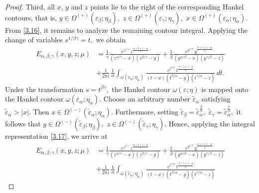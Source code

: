 \documentclass[10pt,a4paper]{amsart}
\begin{document}
\begin{proof}
Third, all $x$, $y$ and $z$ points lie to the right of the corresponding Hankel contours, that is,
$
y\in\Omega^{(+)}(\varepsilon_\beta;\eta_\beta),
\,\,
z\in\Omega^{(+)}(\varepsilon_\gamma;\eta_\gamma),\,\,x\in\Omega^{(+)}(\varepsilon_\alpha;\eta_\alpha)
$.
From \eqref{3.16}, it remains to analyze the remaining contour integral. Applying the change of variables
$
s^{1/\beta\gamma}=t,
$
we obtain
\begin{equation}\label{3.17}\begin{aligned}
E_{\alpha,\beta,\gamma}(x,y,z;\mu)
&=\frac{1}{\gamma}\frac{
e^{z^{1/\gamma}}
\,z^{\frac{\alpha+\beta+1-\mu}{\gamma}}}
{(z^{\alpha/\gamma}-x)(z^{\beta/\gamma}-y)}+\frac{1}{\beta}\frac{
e^{y^{1/\beta}}
\,y^{\frac{\alpha+\gamma+1-\mu}{\beta}}}
{(y^{\alpha/\beta}-x)(y^{\gamma/\beta}-z)}\\
&+
\frac{1}{2\pi i}\,
\frac{1}{\alpha}
\int_{\omega(\varepsilon_\alpha;\eta_\alpha)}
\frac{
e^{t^{1/\alpha}}
\,t^{\frac{\beta+\gamma+1-\mu}{\alpha}}
}
{
(t-x)(t^{\beta/\alpha}-y)(t^{\gamma/\alpha}-z)
}
\,dt.\end{aligned}\end{equation}
Under the transformation
$
s=t^{\beta\gamma},
$
the Hankel contour
$
\omega(\varepsilon;\eta)
$
is mapped onto the Hankel contour
$
\omega(\varepsilon_\alpha;\eta_\alpha).
$ Choose an arbitrary number $\widetilde{\varepsilon}_{\alpha}$ satisfying
$\widetilde{\varepsilon}_{\alpha}>|x|$. Then
$
x\in\Omega^{(-)}(\widetilde{\varepsilon}_{\alpha};\eta_\alpha).
$
Furthermore, setting
$
\widetilde{\varepsilon}_{\beta}
=\widetilde{\varepsilon}_{\alpha}^{\frac{\beta}{\alpha}},
\,\,
\widetilde{\varepsilon}_{\gamma}
=\widetilde{\varepsilon}_{\alpha}^{\frac{\gamma}{\alpha}},
$
it follows that
$
y\in\Omega^{(-)}(\widetilde{\varepsilon}_{\beta};\eta_\beta),
\,\,
z\in\Omega^{(-)}(\widetilde{\varepsilon}_{\gamma};\eta_\gamma).
$ Hence, applying the integral representation \eqref{3.17}, we arrive at
\begin{equation}\label{3.18}\begin{aligned}
E_{\alpha,\beta,\gamma}(x,y,z;\mu)
&=\frac{1}{\gamma}\frac{
e^{z^{1/\gamma}}
\,z^{\frac{\alpha+\beta+1-\mu}{\gamma}}}
{(z^{\alpha/\gamma}-x)(z^{\beta/\gamma}-y)}+\frac{1}{\beta}\frac{
e^{y^{1/\beta}}
\,y^{\frac{\alpha+\gamma+1-\mu}{\beta}}}
{(y^{\alpha/\beta}-x)(y^{\gamma/\beta}-z)}\\
&+
\frac{1}{2\pi i}\,
\frac{1}{\alpha}
\int_{\omega(\widetilde{\varepsilon}_{\alpha};\eta_\alpha)}
\frac{
e^{t^{1/\alpha}}
\,t^{\frac{\beta+\gamma+1-\mu}{\alpha}}
}
{
(t-x)(t^{\beta/\alpha}-y)(t^{\gamma/\alpha}-z)
}
\end{aligned}
\end{equation}
\end{proof}
\end{document}
